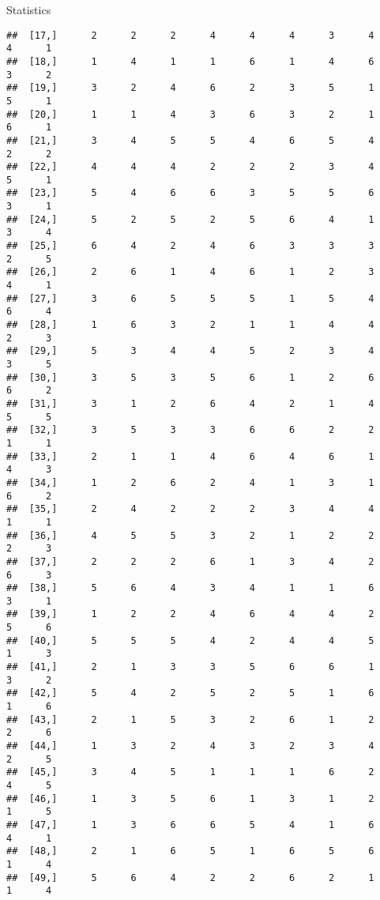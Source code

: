 \documentclass[
  ignorenonframetext,
]{beamer}
\begin{document}
\begin{frame}[fragile]{Statistics}
\begin{verbatim}
##  [17,]      2      2      2      4      4      4      3      4      4      1
##  [18,]      1      4      1      1      6      1      4      6      3      2
##  [19,]      3      2      4      6      2      3      5      1      5      1
##  [20,]      1      1      4      3      6      3      2      1      6      1
##  [21,]      3      4      5      5      4      6      5      4      2      2
##  [22,]      4      4      4      2      2      2      3      4      5      1
##  [23,]      5      4      6      6      3      5      5      6      3      1
##  [24,]      5      2      5      2      5      6      4      1      3      4
##  [25,]      6      4      2      4      6      3      3      3      2      5
##  [26,]      2      6      1      4      6      1      2      3      4      1
##  [27,]      3      6      5      5      5      1      5      4      6      4
##  [28,]      1      6      3      2      1      1      4      4      2      3
##  [29,]      5      3      4      4      5      2      3      4      3      5
##  [30,]      3      5      3      5      6      1      2      6      6      2
##  [31,]      3      1      2      6      4      2      1      4      5      5
##  [32,]      3      5      3      3      6      6      2      2      1      1
##  [33,]      2      1      1      4      6      4      6      1      4      3
##  [34,]      1      2      6      2      4      1      3      1      6      2
##  [35,]      2      4      2      2      2      3      4      4      1      1
##  [36,]      4      5      5      3      2      1      2      2      2      3
##  [37,]      2      2      2      6      1      3      4      2      6      3
##  [38,]      5      6      4      3      4      1      1      6      3      1
##  [39,]      1      2      2      4      6      4      4      2      5      6
##  [40,]      5      5      5      4      2      4      4      5      1      3
##  [41,]      2      1      3      3      5      6      6      1      3      2
##  [42,]      5      4      2      5      2      5      1      6      1      6
##  [43,]      2      1      5      3      2      6      1      2      2      6
##  [44,]      1      3      2      4      3      2      3      4      2      5
##  [45,]      3      4      5      1      1      1      6      2      4      5
##  [46,]      1      3      5      6      1      3      1      2      1      5
##  [47,]      1      3      6      6      5      4      1      6      4      1
##  [48,]      2      1      6      5      1      6      5      6      1      4
##  [49,]      5      6      4      2      2      6      2      1      1      4

\end{verbatim}
\end{frame}
\end{document}
